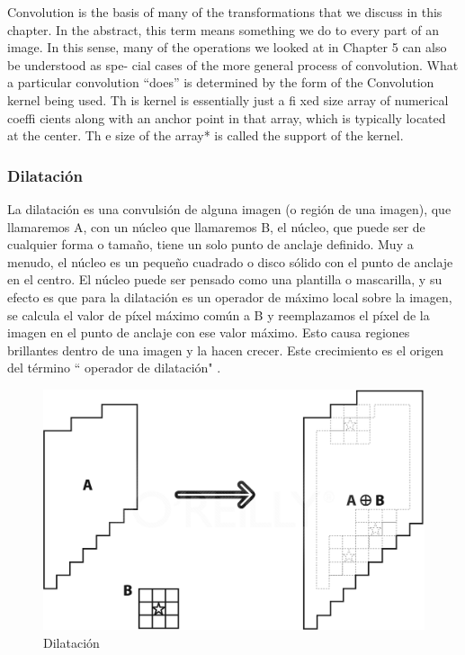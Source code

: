 Convolution is the basis of many of the transformations that we discuss in this chapter.
In the abstract, this term means something we do to every part of an image. In this
sense, many of the operations we looked at in Chapter 5 can also be understood as spe-
cial cases of the more general process of convolution. What a particular convolution
“does” is determined by the form of the Convolution kernel being used. Th is kernel is
essentially just a fi xed size array of numerical coeffi cients along with an anchor point
in that array, which is typically located at the center. Th e size of the array* is called the
support of the kernel.

\subsubsection{Dilatación}
La dilatación es una convulsión de alguna imagen (o región de una imagen), que llamaremos A, con un núcleo que llamaremos B,
el núcleo, que puede ser de cualquier forma o tamaño, tiene un solo punto de anclaje definido. Muy  a menudo, el núcleo es un
pequeño cuadrado o disco sólido con el punto de anclaje en el centro. El núcleo puede ser pensado como una plantilla  o
mascarilla, y su efecto es que para la dilatación es un operador de máximo local sobre la imagen, se calcula el valor de píxel
máximo común a B y reemplazamos el píxel de la imagen en el punto de anclaje con ese valor máximo. Esto causa regiones brillantes
dentro de una imagen y la hacen crecer. Este crecimiento es el origen del término `` operador de dilatación" \cite{BookOpenCv}. 

\begin{figure}[hbtp]

\centering
\includegraphics[scale=0.2]{imagenes/erosion-model.png}
\caption{Dilatación}
\end{figure}


